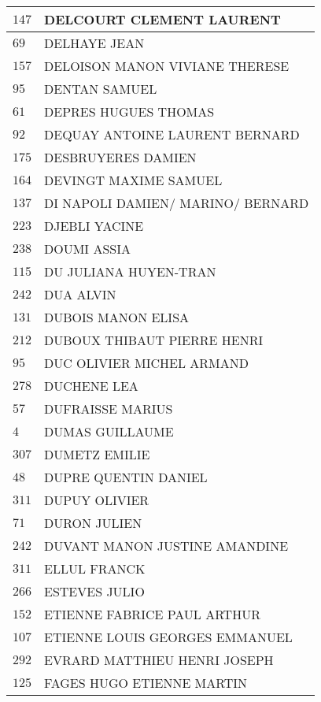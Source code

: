 \begin{xltabular}{\linewidth}{|l|X|}
    \hline
    $147$ & DELCOURT CLEMENT LAURENT \\
    \hline
    $69$ & DELHAYE JEAN \\
    \hline
    $157$ & DELOISON MANON VIVIANE THERESE \\
    \hline
    $95$ & DENTAN SAMUEL \\
    \hline
    $61$ & DEPRES HUGUES THOMAS \\
    \hline
    $92$ & DEQUAY ANTOINE LAURENT BERNARD \\
    \hline
    $175$ & DESBRUYERES DAMIEN \\
    \hline
    $164$ & DEVINGT MAXIME SAMUEL \\
    \hline
    $137$ & DI NAPOLI DAMIEN/ MARINO/ BERNARD \\
    \hline
    $223$ & DJEBLI YACINE \\
    \hline
    $238$ & DOUMI ASSIA \\
    \hline
    $115$ & DU JULIANA HUYEN-TRAN \\
    \hline
    $242$ & DUA ALVIN \\
    \hline
    $131$ & DUBOIS MANON ELISA \\
    \hline
    $212$ & DUBOUX THIBAUT PIERRE HENRI \\
    \hline
    $95$ & DUC OLIVIER MICHEL ARMAND \\
    \hline
    $278$ & DUCHENE LEA \\
    \hline
    $57$ & DUFRAISSE MARIUS \\
    \hline
    $4$ & DUMAS GUILLAUME \\
    \hline
    $307$ & DUMETZ EMILIE \\
    \hline
    $48$ & DUPRE QUENTIN DANIEL \\
    \hline
    $311$ & DUPUY OLIVIER \\
    \hline
    $71$ & DURON JULIEN \\
    \hline
    $242$ & DUVANT MANON JUSTINE AMANDINE \\
    \hline
    $311$ & ELLUL FRANCK \\
    \hline
    $266$ & ESTEVES JULIO \\
    \hline
    $152$ & ETIENNE FABRICE PAUL ARTHUR \\
    \hline
    $107$ & ETIENNE LOUIS GEORGES EMMANUEL \\
    \hline
    $292$ & EVRARD MATTHIEU HENRI JOSEPH \\
    \hline
    $125$ & FAGES HUGO ETIENNE MARTIN \\
    \hline

\end{xltabular}
